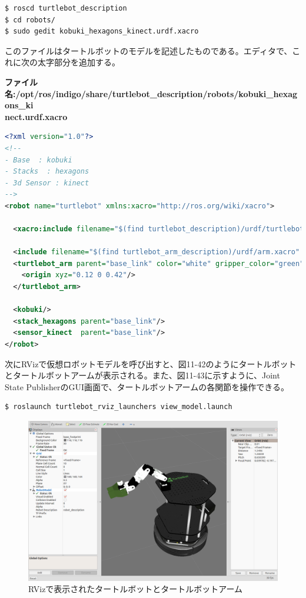 \begin{lstlisting}[language=ROS]
$ roscd turtlebot_description
$ cd robots/
$ sudo gedit kobuki_hexagons_kinect.urdf.xacro
\end{lstlisting}

このファイルはタートルボットのモデルを記述したものである。エディタで、これに次の太字部分を追加する。

\textbf{ファイル名:/opt/ros/indigo/share/turtlebot\_description/robots/kobuki\_hexagons\_ki\\nect.urdf.xacro}
\begin{lstlisting}[language=XML]
<?xml version="1.0"?>
<!--
- Base  : kobuki
- Stacks  : hexagons
- 3d Sensor : kinect
-->
<robot name="turtlebot" xmlns:xacro="http://ros.org/wiki/xacro">

  <xacro:include filename="$(find turtlebot_description)/urdf/turtlebot_library.urdf.xacro" />

  <include filename="$(find turtlebot_arm_description)/urdf/arm.xacro" />
  <turtlebot_arm parent="base_link" color="white" gripper_color="green" joints_vlimit="1.571" pan_llimit="-2.617" pan_ulimit="2.617">
    <origin xyz="0.12 0 0.42"/>
  </turtlebot_arm>

  <kobuki/>
  <stack_hexagons parent="base_link"/>
  <sensor_kinect  parent="base_link"/>
</robot>
\end{lstlisting}

次にRVizで仮想ロボットモデルを呼び出すと、図11-42のようにタートルボットとタートルボットアームが表示される。また、図11-43に示すように、Joint State PublisherのGUI画面で、タートルボットアームの各関節を操作できる。

\begin{lstlisting}[language=ROS]
$ roslaunch turtlebot_rviz_launchers view_model.launch
\end{lstlisting}

\begin{figure}[htp]
  \centering
  \includegraphics[width=12cm]{pictures/chapter11/pic_11_42.png}
  \caption{RVizで表示されたタートルボットとタートルボットアーム}
\end{figure}

